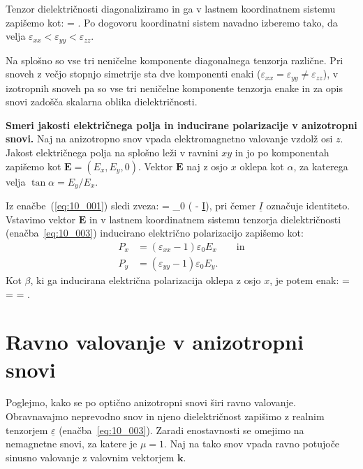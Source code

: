 Tenzor dielektričnosti diagonaliziramo in ga v lastnem koordinatnem 
sistemu zapišemo kot:
\beq
\underline{\varepsilon} = 
\!\!.
\label{eq:10_003}
\eeq
Po dogovoru koordinatni sistem navadno izberemo tako, da velja 
$\varepsilon_{xx}<\varepsilon_{yy}<\varepsilon_{zz}$.

Na splošno so vse tri neničelne komponente diagonalnega tenzorja različne. 
Pri snoveh z večjo stopnjo simetrije sta dve komponenti enaki ($\varepsilon_{xx} = 
\varepsilon_{yy} \neq \varepsilon_{zz}$), v izotropnih snoveh pa so vse tri 
neničelne komponente tenzorja enake in za opis snovi zadošča skalarna oblika dielektričnosti.

\begin{example}{\bf Smeri jakosti električnega polja 
in inducirane polarizacije v anizotropni snovi.}
Naj na anizotropno snov vpada elektromagnetno valovanje vzdolž osi $z$. Jakost
elek\-trič\-ne\-ga polja na splošno leži v ravnini $xy$ in jo po komponentah
zapišemo kot $\mathbf{E} = (E_x, E_y, 0)$. Vektor $\mathbf{E}$ naj z osjo $x$
oklepa kot $\alpha$, za katerega velja $\tan \alpha  = E_y/E_x$.

Iz enačbe~(\ref{eq:10_001}) sledi zveza:
\beq
{} = \varepsilon_0 \left(\underline{\varepsilon} - \underline{I}\right),
\label{eq:10_004}
\eeq
pri čemer $\underline{I}$ označuje identiteto.
Vstavimo vektor $\mathbf{E}$ in v lastnem koordinatnem sistemu tenzorja 
dielektričnosti (enačba~\ref{eq:10_003}) inducirano električno polarizacijo zapišemo kot:
\begin{align}
P_x &= (\varepsilon_{xx}-1) \varepsilon_0 E_x \qquad \mathrm{in} \label{eq:10_005}\\
P_y &= (\varepsilon_{yy}-1) \varepsilon_0 E_y.
\label{eq:10_006}
\end{align}
Kot $\beta$, ki ga inducirana električna polarizacija oklepa z osjo $x$, je potem enak:
\beq
\tan \beta =  = 
 = \tan \alpha.
\eeq
\end{example}

\section{Ravno valovanje v anizotropni snovi}
Poglejmo, kako se po optično anizotropni snovi širi ravno valovanje. 
Obravnavajmo neprevodno snov in njeno dielektričnost 
zapišimo z realnim tenzorjem $\underline{\varepsilon}$ (enačba~\ref{eq:10_003}). 
Zaradi enostavnosti se omejimo na nemagnetne snovi, za katere je $\mu = 1$. 
Naj na tako snov vpada ravno potujoče sinusno valovanje z 
valovnim vektorjem $\mathbf{k}$.  

